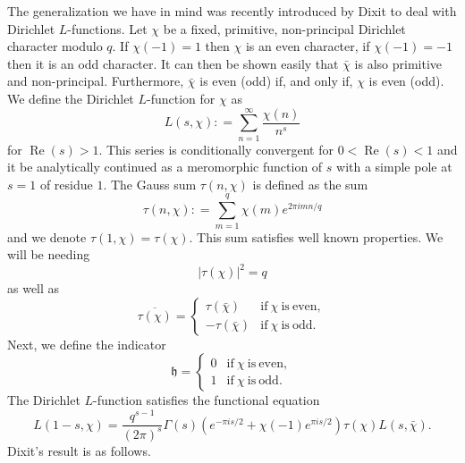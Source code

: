 \documentclass[11pt]{article}
\numberwithin{equation}{section}		 			%
\numberwithin{figure}{section}			 			%
\begin{document}
The generalization we have in mind was recently introduced by Dixit \cite{dixit_1} to deal with Dirichlet $L$-functions. Let $\chi$ be a fixed, primitive, non-principal Dirichlet character modulo $q$. If $\chi(-1)=1$ then $\chi$ is an even character, if $\chi(-1)=-1$ then it is an odd character. It can then be shown easily that $\bar \chi$ is also primitive and non-principal. Furthermore, $\bar \chi$ is even (odd) if, and only if, $\chi$ is even (odd). We define the Dirichlet $L$-function for $\chi$ as
\[
L(s,\chi ): = \sum\limits_{n = 1}^\infty  {\frac{{\chi (n)}}{{n^s }}} 
\]
for $\operatorname{Re}(s) >1$. This series is conditionally convergent for $0 < \operatorname{Re}(s) <1$ and it be analytically continued as a meromorphic function of $s$ with a simple pole at $s=1$ of residue $1$. The Gauss sum $\tau(n,\chi)$ is defined as the sum
\[
\tau(n,\chi ): = \sum\limits_{m = 1}^q {\chi (m)e^{2\pi imn/q} } 
\]
and we denote $\tau(1,\chi)=\tau(\chi)$. This sum satisfies well known properties. We will be needing
\[
\left| {\tau(\chi )} \right|^2  = q
\]
as well as
\begin{equation}
\overline {\tau(\chi)} =
			\begin{cases}
\tau(\bar \chi ) & \mathrm{if\ } \chi \mathrm{\ is\ even}, \\ 
-\tau(\bar \chi ) & \mathrm{if\ } \chi \mathrm{\ is\ odd}. \nonumber
			\end{cases}
\end{equation}
Next, we define the indicator
\begin{equation}
\mathfrak{h} =
			\begin{cases}
0 & \mathrm{if\ } \chi \mathrm{\ is\ even}, \\ 
1 & \mathrm{if\ } \chi \mathrm{\ is\ odd}. \nonumber
			\end{cases}
\end{equation}
The Dirichlet $L$-function satisfies the functional equation
\[
L(1 - s,\chi ) = \frac{{q^{s - 1} }}{{(2\pi )^s }}\Gamma (s)(e^{ - \pi is/2}  + \chi ( - 1)e^{\pi is/2} ) \tau(\chi) L(s,\bar \chi ).
\]
Dixit's result is as follows.
\end{document}
